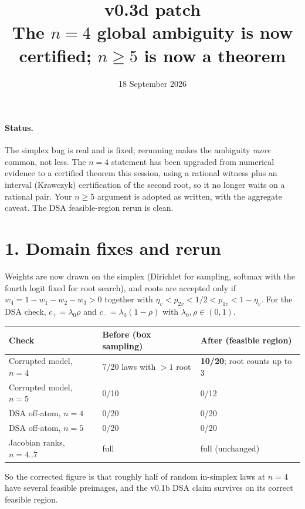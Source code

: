 \documentclass[11pt]{article}
\title{\textbf{v0.3d patch}\\[2pt]
\large The $n=4$ global ambiguity is now certified; $n\ge5$ is now a theorem}
\author{18 September 2026}
\date{}
\theoremstyle{remark}
\begin{document}
\maketitle
\vspace{-2.5em}

\paragraph{Status.} The simplex bug is real and is fixed; rerunning makes the ambiguity \emph{more} common, not less. The $n=4$ statement has been upgraded from numerical evidence to a certified theorem this session, using a rational witness plus an interval (Krawczyk) certification of the second root, so it no longer waits on a rational pair. Your $n\ge5$ argument is adopted as written, with the aggregate caveat. The DSA feasible-region rerun is clean.

\section*{1. Domain fixes and rerun}

Weights are now drawn on the simplex (Dirichlet for sampling, softmax with the fourth logit fixed for root search), and roots are accepted only if $w_4=1-w_1-w_2-w_3>0$ together with $\eta_v<p_{2v}<1/2<p_{1v}<1-\eta_v$. For the DSA check, $c_+=\lambda_0\rho$ and $c_-=\lambda_0(1-\rho)$ with $\lambda_0,\rho\in(0,1)$.

\begin{center}\small
\begin{tabular}{@{}lll@{}}
\toprule
Check & Before (box sampling) & After (feasible region)\\
\midrule
Corrupted model, $n=4$ & 7/20 laws with $>1$ root & \textbf{10/20}; root counts up to 3\\
Corrupted model, $n=5$ & 0/10 & 0/12\\
DSA off-atom, $n=4$ & 0/20 & 0/20\\
DSA off-atom, $n=5$ & 0/20 & 0/20\\
Jacobian ranks, $n=4..7$ & full & full (unchanged)\\
\bottomrule
\end{tabular}
\end{center}

So the corrected figure is that roughly half of random in-simplex laws at $n=4$ have several feasible preimages, and the v0.1b DSA claim survives on its correct feasible region.
\end{document}
